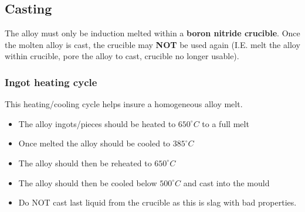 \subsection{Casting}

The \MgZnCa alloy must only be induction melted within a \textbf{boron nitride crucible}. Once the molten alloy is cast, the crucible may \textbf{NOT} be used again (I.E. melt the alloy within crucible, pore the alloy to cast, crucible no longer usable). 

\subsubsection{Ingot heating cycle}

This heating/cooling cycle helps insure a homogeneous alloy melt.
\begin{itemize}
\item The \MgZnCa  alloy ingots/pieces should be heated to $650^{\circ}C$ to a full melt
\item Once melted the alloy should be cooled to $385^{\circ}C$
\item The alloy should then be reheated to $650^{\circ}C$
\item The alloy should then be cooled below $500^{\circ}C$ and cast into the mould
\item Do NOT cast last liquid from the crucible as this is slag with bad properties. 
\end{itemize}